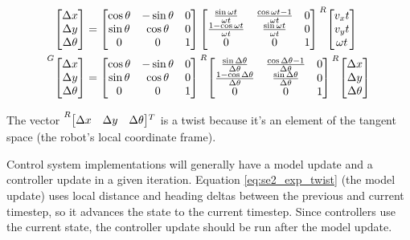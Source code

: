 \begin{align}
{\begin{bmatrix}
    \Delta x \\
    \Delta y \\
    \Delta \theta
  \end{bmatrix}} &=
  \begin{bmatrix}
    \cos\theta & -\sin\theta & 0 \\
    \sin\theta &  \cos\theta & 0 \\
             0 &           0 & 1
  \end{bmatrix}
  \begin{bmatrix}
    \frac{\sin\omega t}{\omega t} & \frac{\cos\omega t - 1}{\omega t} & 0 \\
    \frac{1 - \cos\omega t}{\omega t} & \frac{\sin\omega t}{\omega t} & 0 \\
    0 & 0 & 1
  \end{bmatrix}
  \prescript{R}{}{\begin{bmatrix}
    v_x t \\
    v_y t \\
    \omega t
  \end{bmatrix}} \nonumber \\
  \prescript{G}{}{\begin{bmatrix}
    \Delta x \\
    \Delta y \\
    \Delta \theta
  \end{bmatrix}} &=
  \begin{bmatrix}
    \cos\theta & -\sin\theta & 0 \\
    \sin\theta &  \cos\theta & 0 \\
             0 &           0 & 1
  \end{bmatrix}
  \prescript{R}{}{\begin{bmatrix}
    \frac{\sin\Delta\theta}{\Delta\theta} &
      \frac{\cos\Delta\theta - 1}{\Delta\theta} & 0 \\
    \frac{1 - \cos\Delta\theta}{\Delta\theta} &
      \frac{\sin\Delta\theta}{\Delta\theta} & 0 \\
    0 & 0 & 1
  \end{bmatrix}}
  \prescript{R}{}{\begin{bmatrix}
    \Delta x \\
    \Delta y \\
    \Delta\theta
  \end{bmatrix}}
  \label{eq:se2_exp_twist}
\end{align}

The vector
$\prescript{R}{}{\begin{bmatrix}\Delta x & \Delta y & \Delta\theta \end{bmatrix}}^T$
is a twist because it's an element of the tangent space (the robot's local
coordinate frame).
\begin{remark}
  Control system implementations will generally have a model update and a
  controller update in a given iteration. Equation \eqref{eq:se2_exp_twist} (the
  model update) uses local distance and heading deltas between the previous and
  current timestep, so it advances the state to the current timestep. Since
  controllers use the current state, the controller update should be run after
  the model update.
\end{remark}

